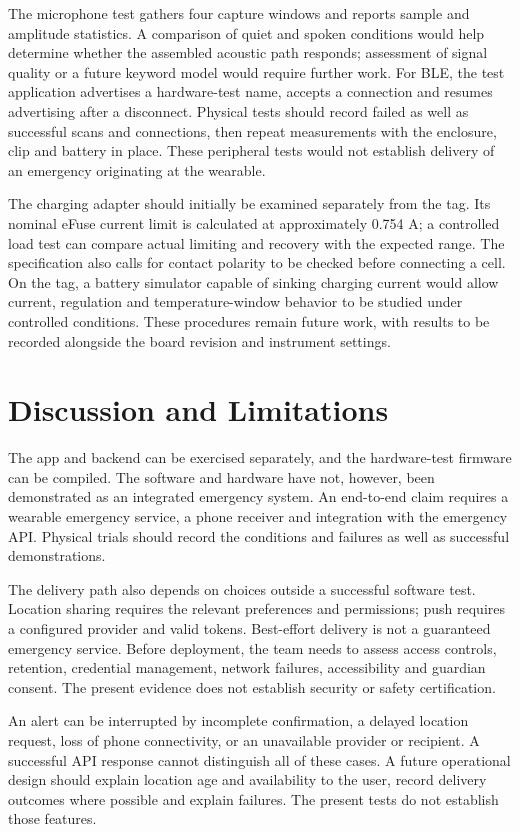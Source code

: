 \documentclass[nolineno]{ieeeaccess}
\begin{document}
The microphone test gathers four capture windows and reports sample and amplitude statistics. A comparison of quiet and spoken conditions would help determine whether the assembled acoustic path responds; assessment of signal quality or a future keyword model would require further work. For BLE, the test application advertises a hardware-test name, accepts a connection and resumes advertising after a disconnect. Physical tests should record failed as well as successful scans and connections, then repeat measurements with the enclosure, clip and battery in place. These peripheral tests would not establish delivery of an emergency originating at the wearable.

The charging adapter should initially be examined separately from the tag. Its nominal eFuse current limit is calculated at approximately 0.754 A; a controlled load test can compare actual limiting and recovery with the expected range. The specification also calls for contact polarity to be checked before connecting a cell. On the tag, a battery simulator capable of sinking charging current would allow current, regulation and temperature-window behavior to be studied under controlled conditions. These procedures remain future work, with results to be recorded alongside the board revision and instrument settings.

\section{Discussion and Limitations}
The app and backend can be exercised separately, and the hardware-test firmware can be compiled. The software and hardware have not, however, been demonstrated as an integrated emergency system. An end-to-end claim requires a wearable emergency service, a phone receiver and integration with the emergency API. Physical trials should record the conditions and failures as well as successful demonstrations.

The delivery path also depends on choices outside a successful software test. Location sharing requires the relevant preferences and permissions; push requires a configured provider and valid tokens. Best-effort delivery is not a guaranteed emergency service. Before deployment, the team needs to assess access controls, retention, credential management, network failures, accessibility and guardian consent. The present evidence does not establish security or safety certification.

An alert can be interrupted by incomplete confirmation, a delayed location request, loss of phone connectivity, or an unavailable provider or recipient. A successful API response cannot distinguish all of these cases. A future operational design should explain location age and availability to the user, record delivery outcomes where possible and explain failures. The present tests do not establish those features.
\end{document}
